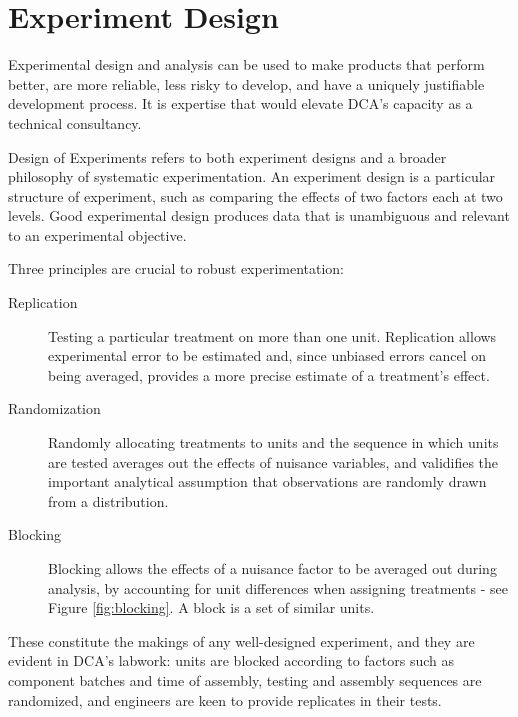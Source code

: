 \documentclass[11pt,a4paper,article]{memoir} %
\begin{document}
\section{Experiment Design}
Experimental design and analysis can be used to make products that perform better, are more reliable, less risky to develop, and have a uniquely justifiable development process. It is expertise that would elevate DCA's capacity as a technical consultancy.
\par
Design of Experiments refers to both experiment designs and a broader philosophy of systematic experimentation. An experiment design is a particular structure of experiment, such as comparing the effects of two factors each at two levels. Good experimental design produces data that is unambiguous and relevant to an experimental objective.
\par
Three principles are crucial to robust experimentation:
\begin{description}
\item[Replication]{Testing a particular treatment on more than one unit. Replication allows experimental error to be estimated and, since unbiased errors cancel on being averaged, provides a more precise estimate of a treatment's effect.}
\item[Randomization]{Randomly allocating treatments to units and the sequence in which units are tested averages out the effects of nuisance variables, and validifies the important analytical assumption that observations are randomly drawn from a distribution.}
\item[Blocking]{Blocking allows the effects of a nuisance factor to be averaged out during analysis, by accounting for unit differences when assigning treatments - see Figure \ref{fig:blocking}. A block is a set of similar units.}
\end{description}
These constitute the makings of any well-designed experiment, and they are evident in DCA's labwork: units are blocked according to factors such as component batches and time of assembly, testing and assembly sequences are randomized, and engineers are keen to provide replicates in their tests.
\end{document}
